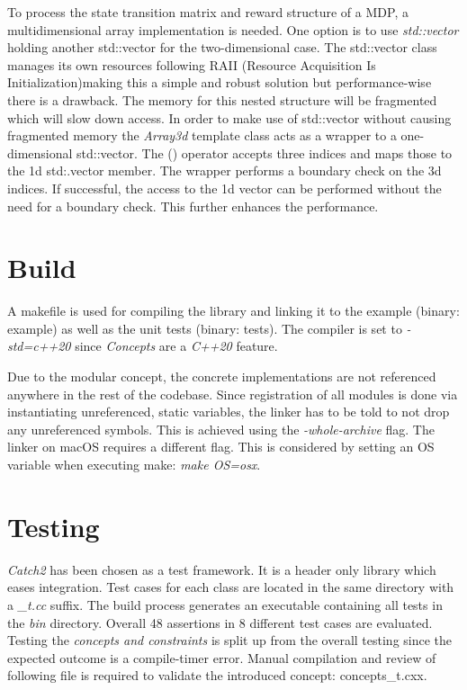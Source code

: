 To process the state transition matrix and reward structure of a MDP, a multidimensional array implementation is needed. One option is to use \emph{std::vector} holding another std::vector for the two-dimensional case. The std::vector class manages its own resources following RAII (Resource Acquisition Is Initialization)making this a simple and robust solution but performance-wise there is a drawback. The memory for this nested structure will be fragmented which will slow down access. 
In order to make use of std::vector without causing fragmented memory the \emph{Array3d} template class acts as a wrapper to a one-dimensional std::vector. The () operator accepts three indices and maps those to the 1d std:.vector member. The wrapper performs a boundary check on the 3d indices. If successful, the access to the 1d vector can be performed without the need for a boundary check. This further enhances the performance.  

\section{Build}

A makefile is used for compiling the library and linking it to the example (binary: example) as well as the unit tests (binary: tests). The compiler is set to \emph{-std=c++20} since \emph{Concepts} are a \emph{C++20} feature. 

Due to the modular concept, the concrete implementations are not referenced anywhere in the rest of the codebase. Since registration of all modules is done via instantiating unreferenced, static variables, the linker has to be told to not drop any unreferenced symbols. This is achieved using the \emph{-whole-archive} flag. The linker on macOS requires a different flag. This is considered by setting an OS variable when executing make: \emph{make OS=osx}.



\section{Testing}

\emph{Catch2}\autocite{Catch} has been chosen as a test framework. It is a header only library which eases integration. Test cases for each class are located in the same directory with a \emph{\_t.cc} suffix. The build process generates an executable containing all tests in the \emph{bin} directory. Overall 48 assertions in 8 different test cases are evaluated. 
Testing the \emph{concepts and constraints} is split up from the overall testing since the expected outcome is a compile-timer error. Manual compilation and review of following file is required to validate the introduced concept: concepts\_t.cxx.
